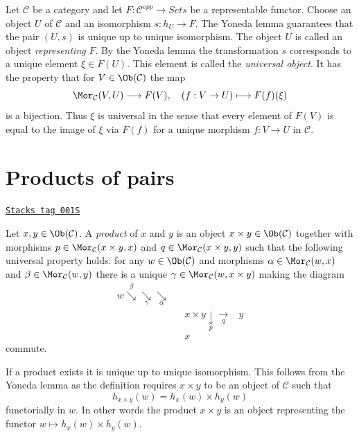 Let $\mathcal{C}$ be a category and let
$F : \mathcal{C}^{opp} \to \textit{Sets}$ be a representable functor.
Choose an object $U$ of $\mathcal{C}$ and an isomorphism $s : h_U \to F$.
The Yoneda lemma guarantees that the pair $(U, s)$
is unique up to unique isomorphism. The object
$U$ is called an object {\it representing} $F$.
By the Yoneda lemma the transformation $s$ corresponds to a unique
element $\xi \in F(U)$. This element is called the {\it universal object}.
It has the property that for $V \in \Ob(\mathcal{C})$ the map
$$
\Mor_\mathcal{C}(V, U) \longrightarrow F(V),\quad
(f : V \to U) \longmapsto F(f)(\xi)
$$
is a bijection. Thus $\xi$ is universal in the sense that every element
of $F(V)$ is equal to the image of $\xi$ via $F(f)$ for a unique morphism
$f : V \to U$ in $\mathcal{C}$.

\section{Products of pairs}
\label{categories-section-products-pairs}
\begin{definition}[Products]
\label{categories-definition-products}
\href{https://stacks.math.columbia.edu/tag/001S}{\texttt{Stacks tag 001S}}

Let $x, y\in \Ob(\mathcal{C})$.
A {\it product} of $x$ and $y$ is
an object $x \times y \in \Ob(\mathcal{C})$
together with morphisms
$p\in \Mor_{\mathcal C}(x \times y, x)$ and
$q\in\Mor_{\mathcal C}(x \times y, y)$ such
that the following universal property holds: for
any $w\in \Ob(\mathcal{C})$ and morphisms
$\alpha \in \Mor_{\mathcal C}(w, x)$ and
$\beta \in \Mor_\mathcal{C}(w, y)$
there is a unique
$\gamma\in \Mor_{\mathcal C}(w, x \times y)$ making
the diagram
$$
\begin{array}{cccc}w \overset{\beta}{\searrow}\underset{\gamma}{\searrow}\underset{\alpha}{\searrow} &  &  &  \\  &  & x \times y \underset{p}{\downarrow}\underset{q}{\longrightarrow} & y \\  &  & x & \end{array}
$$
commute.
\end{definition}

If a product exists it is unique up to unique
isomorphism. This follows from the Yoneda lemma as
the definition requires $x \times y$ to be an object
of $\mathcal{C}$ such that
$$
h_{x \times y}(w) = h_x(w) \times h_y(w)
$$
functorially in $w$. In other words the product $x \times y$
is an object representing the functor
$w \mapsto h_x(w) \times h_y(w)$.

